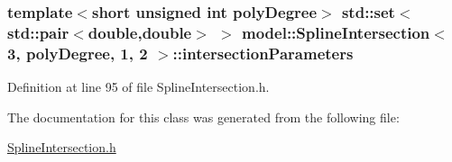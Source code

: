 \subsubsection[{intersection\+Parameters}]{\setlength{\rightskip}{0pt plus 5cm}template$<$short unsigned int poly\+Degree$>$ {\bf std\+::set}$<$std\+::pair$<$double,double$>$ $>$ {\bf model\+::\+Spline\+Intersection}$<$ 3, poly\+Degree, 1, 2 $>$\+::intersection\+Parameters}\label{classmodel_1_1_spline_intersection_3_013_00_01poly_degree_00_011_00_012_01_4_a41c8a31ab37c2112283a2e7fbbfab2f6}


Definition at line 95 of file Spline\+Intersection.\+h.



The documentation for this class was generated from the following file\+:\begin{DoxyCompactItemize}
\item 
\hyperlink{_spline_intersection_8h}{Spline\+Intersection.\+h}\end{DoxyCompactItemize}
